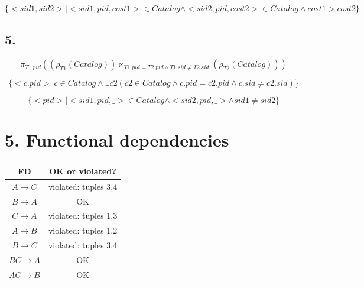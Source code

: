 \documentclass[10pt,a4paper,final]{report}
\begin{document}
$$\{ <sid1, sid2>| <sid1,pid,cost1> \in Catalog \land <sid2,pid,cost2> \in Catalog \land cost1 > cost2\}$$

\subsection*{5.}

$$\pi_{T1.pid}((\rho_{T1}(Catalog))\Join_{T1.pid = T2.pid \land T1.sid \neq T2.sid}(\rho_{T2}(Catalog)))$$

$$\{ <c.pid>| c \in Catalog \land \exists c2 (c2 \in Catalog \land c.pid = c2.pid \land c.sid \neq c2.sid)\}$$

$$\{<pid>|<sid1,pid,\_> \in Catalog \land <sid2,pid,\_> \land sid1 \neq sid2\}$$

\section*{5. Functional dependencies}
\begin{tabular}{|c|c|}
\hline 
FD & OK or violated? \\ 
\hline 
$A\rightarrow C$ & violated: tuples 3,4 \\ 
\hline 
$B\rightarrow A$ & OK \\ 
\hline 
 $C\rightarrow A$ & violated: tuples 1,3 \\ 
\hline 
$A\rightarrow B$ & violated: tuples 1,2 \\ 
\hline 
$B\rightarrow C$ & violated: tuples 3,4 \\ 
\hline 
$BC\rightarrow A$ & OK \\ 
\hline 
$AC\rightarrow B$ & OK \\ 
\hline 
\end{tabular} 
\end{document}
